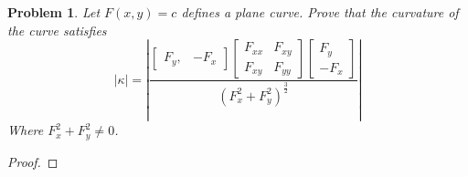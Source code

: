 \documentclass[12pt,a4paper]{article}
\newcounter{theProblemCounter}
\newtheorem{problem}[theProblemCounter]{Problem}
\begin{document}
\begin{problem}
Let $F(x, y)=c$ defines a plane curve. Prove that the curvature of the curve satisfies
\[
|\kappa| = \left|
\frac{
\left[
\begin{array}{cc} F_y, & -F_x\end{array}
\right]
\left[
\begin{array}{cc} F_{xx} & F_{xy} \\ F_{xy} & F_{yy} \end{array}
\right]
\left[
\begin{array}{c} F_y \\ -F_x\end{array}
\right]
}{(F_x^2+F_y^2)^\frac32}
\right|
\]
Where $F_x^2+F_y^2\ne 0$.
\end{problem}
\begin{proof}
\end{proof}
\end{document}

